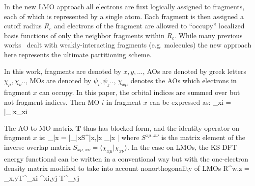 \documentclass[aps,prl,twocolumn,reprint,amsmath,amssymb]{revtex4-1}
\begin{document}
\label{marker:theory} In the new LMO approach all electrons are first logically assigned to fragments, each of which is represented by a single atom. Each fragment is then assigned a cutoff radius $R_c$ and electrons of the fragment are allowed to ``occupy'' localized basis functions of only the neighbor fragments within $R_c$. %
%
%
While many previous works~\cite{ZZZ} dealt with weakly-interacting fragments (e.g. molecules) the new approach here represents the ultimate partitioning scheme.

In this work, fragments are denoted by $x,y,\ldots$, AOs are denoted by greek letters $\chi_\mu,\chi_\nu ..$, MOs are denoted by $\psi_i,\psi_j..$, $\chi_{x\mu}$ denotes the AOs which electrons in fragment $x$ can occupy. In this paper, the orbital indices are summed over but not fragment indices. Then MO $i$ in fragment $x$ can be expressed as:
\bea
\psi_{xi} = |\chi_{\bar{x}\mu}_{xi}
\label{eq:LMO}
\eea

The AO to MO matrix $\mathbf{T}$ thus has blocked form, and the identity operator on fragment $x$ is:
%
\bea
{}_{\bar{x}} = |\chi_{\bar{x}\mu}\rangle S^{\bar{x}\mu,\bar{x}\nu} \langle \chi_{\bar{x}\nu} |
\eea
%
where $S^{x\mu,x\nu}$ is the matrix element of the inverse overlap matrix $S_{x\mu,x\nu} = \langle \chi_{x\mu}| \chi_{x\nu}\rangle $. In the case on LMOs, the KS DFT energy functional can be written in a conventional way but with the one-electron density matrix modified to take into account nonorthogonality of LMOs
\bea \label{eq:dm}
R^{w\mu,z\nu} = \sum_{x,y}{T^{\mu}}_{xi} \sigma^{xi,yj} {T^{\nu}}_{yj}
\eea
%

\end{document}
